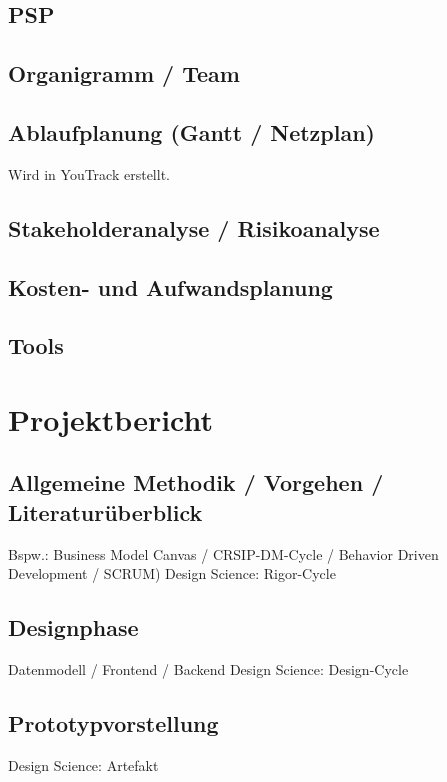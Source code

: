 \documentclass[a4paper, 12pt]{article}
\begin{document}
    \subsection{PSP}
    
    \subsection{Organigramm / Team}
    
    \subsection{Ablaufplanung (Gantt / Netzplan)}
    Wird in YouTrack erstellt.
    
    \subsection{Stakeholderanalyse / Risikoanalyse}
    
    \subsection{Kosten- und Aufwandsplanung}

    \subsection{Tools}\label{subsec:tools}

    \newpage
    
    \section{Projektbericht}
    
    \subsection{Allgemeine Methodik / Vorgehen / Literaturüberblick}
    Bspw.: Business Model Canvas / CRSIP-DM-Cycle / Behavior Driven Development / SCRUM)
    Design Science: Rigor-Cycle
    
    \subsection{Designphase}\label{subsec:designphase}
    Datenmodell / Frontend / Backend
    Design Science: Design-Cycle
    
    \subsection{Prototypvorstellung}
    Design Science: Artefakt
\end{document}
